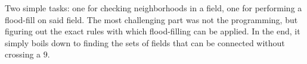 Two simple tasks: one for checking neighborhoods in a field, one for performing a flood-fill on said field. The most challenging part was not the programming, but figuring out the exact rules with which flood-filling can be applied. In the end, it simply boils down to finding the sets of fields that can be connected without crossing a $9$.